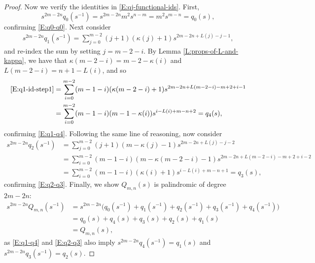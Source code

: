 \documentclass[10pt,a4paper]{amsart}
\begin{document}
\begin{proof}
Now we verify the identities in \eqref{E:qj-functional-ids}.
First,
\begin{equation*}
s^{2m-2n}q_0(s^{-1}) = s^{2m-2n} m^2 s^{n-m} = m^2 s^{m-n} = q_0(s),
\end{equation*}
confirming \eqref{E:q0-q0}.
Next consider
\begin{align}
s^{2m-2n}q_1(s^{-1}) = \sum_{j=0}^{m-2} (j+1)(\kappa(j)+1) s^{2m-2n+L(j)-j-1}, \label{E:q1-id-step1}
\end{align}
and re-index the sum by setting $j = m-2-i$. 
By Lemma \ref{L:props-of-L-and-kappa}, we have that $\kappa(m-2-i) = m-2-\kappa(i)$ and $L(m-2-i) = n + 1 - L(i)$, and so
\begin{align*}
\eqref{E:q1-id-step1} 
&= \sum_{i=0}^{m-2} (m-1-i)(\kappa(m-2-i)+1) s^{2m-2n+L(m-2-i)-m+2+i-1} \\
&= \sum_{i=0}^{m-2} (m-1-i)(m-1-\kappa(i)) s^{i-L(i)+m-n+2} = q_4(s),
\end{align*}
confirming \eqref{E:q1-q4}.
Following the same line of reasoning, now consider
\begin{align*}
s^{2m-2n}q_2(s^{-1}) &= \sum_{j=0}^{m-2} (j+1)(m-\kappa(j)-1) s^{2m-2n+L(j)-j-2} \\
&= \sum_{i=0}^{m-2} (m-1-i)(m-\kappa(m-2-i)-1) s^{2m-2n+L(m-2-i)-m+2+i-2} \\
&= \sum_{i=0}^{m-2} (m-1-i)(\kappa(i)+1) s^{i-L(i)+m-n+1} = q_3(s),
\end{align*}
confirming \eqref{E:q2-q3}.
Finally, we show $Q_{m,n}(s)$ is palindromic of degree $2m-2n$:
\begin{align*}
s^{2m-2n}Q_{m,n}(s^{-1}) &= s^{2m-2n} \big( q_0(s^{-1}) +  q_1(s^{-1}) +  q_2(s^{-1}) +  q_3(s^{-1}) + q_4(s^{-1}) \big) \\
&= q_0(s) + q_4(s) + q_3(s) + q_2(s) + q_1(s) \\
&= Q_{m,n}(s),
\end{align*}
as \eqref{E:q1-q4} and \eqref{E:q2-q3} also imply $s^{2m-2n}q_4(s^{-1}) = q_1(s)$ and $s^{2m-2n}q_3(s^{-1}) = q_2(s)$.
\end{proof}
\end{document}
